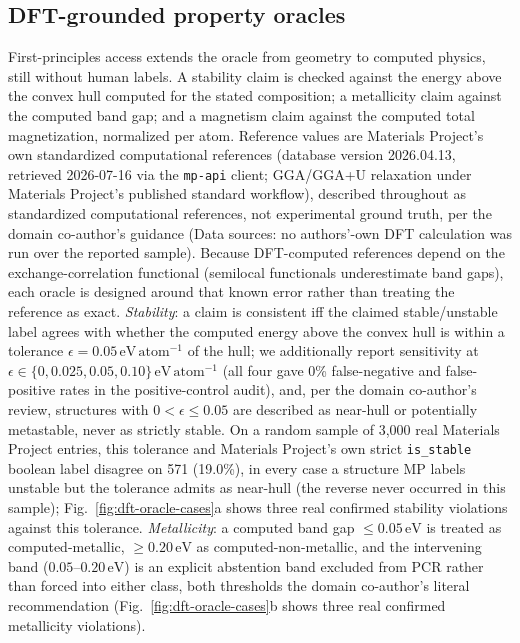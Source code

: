 \documentclass[pdflatex,sn-nature]{sn-jnl}
\begin{document}
\subsection*{DFT-grounded property oracles}
First-principles access extends the oracle from geometry to computed physics, still
without human labels. A stability claim is checked against the energy above the
convex hull computed for the stated composition; a metallicity claim against the
computed band gap; and a magnetism claim against the computed total magnetization,
normalized per atom. Reference values are Materials Project's own standardized
computational references (database version 2026.04.13, retrieved 2026-07-16 via the
\texttt{mp-api} client; GGA/GGA+U relaxation under Materials Project's published standard
workflow), described throughout as standardized computational references, not
experimental ground truth, per the domain co-author's guidance (Data sources: no
authors'-own DFT calculation was run over the reported sample). Because DFT-computed
references depend on the exchange-correlation functional (semilocal functionals
underestimate band gaps), each oracle is designed around that known error rather than
treating the reference as exact. \emph{Stability}: a claim is consistent iff the claimed
stable/unstable label agrees with whether the computed energy above the convex hull is
within a tolerance $\epsilon=0.05\,\mathrm{eV\,atom^{-1}}$ of the hull; we additionally
report sensitivity at $\epsilon\in\{0,0.025,0.05,0.10\}\,\mathrm{eV\,atom^{-1}}$ (all four
gave 0\% false-negative and false-positive rates in the positive-control audit), and, per
the domain co-author's review, structures with $0<\epsilon\le0.05$ are described as
near-hull or potentially metastable, never as strictly stable. On a random sample of 3,000
real Materials Project entries, this tolerance and Materials Project's own strict
\texttt{is\_stable} boolean label disagree on 571 (19.0\%), in every case a structure MP
labels unstable but the tolerance admits as near-hull (the reverse never occurred in this
sample); Fig.~\ref{fig:dft-oracle-cases}a shows three real confirmed stability violations
against this tolerance. \emph{Metallicity}: a
computed band gap $\le0.05\,\mathrm{eV}$ is treated as computed-metallic,
$\ge0.20\,\mathrm{eV}$ as computed-non-metallic, and the intervening band
($0.05$--$0.20\,\mathrm{eV}$) is an explicit abstention band excluded from PCR rather than
forced into either class, both thresholds the domain co-author's literal recommendation
(Fig.~\ref{fig:dft-oracle-cases}b shows three real confirmed metallicity violations).
\end{document}
